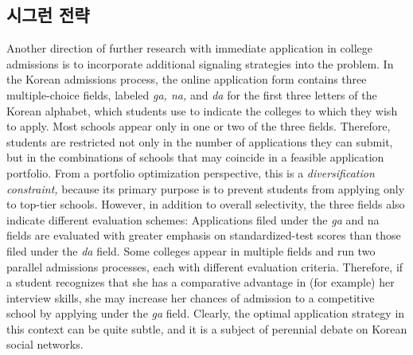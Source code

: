 \documentclass[11pt]{article} %
\newif\ifen
\theoremstyle{definition}
\theoremstyle{definition}
\begin{document}
\ifen \subsection{Signaling strategies}\else \subsection{시그런 전략}\fi
\ifen
Another direction of further research with immediate application in college admissions is to incorporate additional signaling strategies into the problem. In the Korean admissions process, the online application form contains three multiple-choice fields, labeled \emph{ga, na,} and \emph{da} for the first three letters of the Korean alphabet, which students use to indicate the colleges to which they wish to apply. Most schools appear only in one or two of the three fields. Therefore, students are restricted not only in the number of applications they can submit, but in the combinations of schools that may coincide in a feasible application portfolio. From a portfolio optimization perspective, this is a \emph{diversification constraint,} because its primary purpose is to prevent students from applying only to top-tier schools. However, in addition to overall selectivity, the three fields also indicate different evaluation schemes: Applications filed under the \emph{ga} and {na} fields are evaluated with greater emphasis on standardized-test scores than those filed under the \emph{da} field. Some colleges appear in multiple fields and run two parallel admissions processes, each with different evaluation criteria. Therefore, if a student recognizes that she has a comparative advantage in (for example) her interview skills, she may increase her chances of admission to a competitive school by applying under the \emph{ga} field. Clearly, the optimal application strategy in this context can be quite subtle, and it is a subject of perennial debate on Korean social networks.
\end{document}
